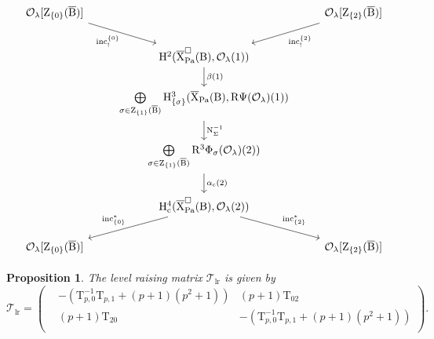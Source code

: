 \documentclass[10pt,a4paper]{amsart}
\newtheorem{proposition}{Proposition}
\def\Pa{\mathrm{Pa}}
\def\calO{\mathcal{O}}
\def\calT{\mathcal{T}}
\def\rmB{\mathrm{B}}
\def\rmH{\mathrm{H}}
\def\rmR{\mathrm{R}}
\def\rmT{\mathrm{T}}
\def\rmX{\mathrm{X}}
\def\rmZ{\mathrm{Z}}
\def\rmc{\mathrm{c}}
\begin{document}
\begin{equation}\label{level-raise-diagram}
\begin{tikzcd}
 \calO_{\lambda}[\rmZ_{\{0\}}(\overline{\rmB})] \arrow[rd, "\mathrm{inc}^{\{0\}}_{!}"'] &                                    &  \calO_{\lambda}[\rmZ_{\{2\}}(\overline{\rmB})]\arrow[ld, "\mathrm{inc}^{\{2\}}_{!}"] \\
                   & \rmH^{2}(\overline{\rmX}^{\square}_{\Pa}(\rmB), \calO_{\lambda}(1)) \arrow[d, "\beta(1)"]                   &                   \\
                   & \bigoplus\limits_{\sigma\in \rmZ_{\{1\}}(\overline{\rmB})}\rmH^{3}_{\{\sigma\}}(\overline{\rmX}_{\Pa}(\rmB), \rmR\Psi(\calO_{\lambda})(1)) \arrow[d, "\mathrm{N}^{-1}_{\Sigma}"]                   &                   \\
                   & \bigoplus\limits_{\sigma\in \rmZ_{\{1\}}(\overline{\rmB})}\rmR^{3}\Phi_{\sigma}(\calO_{\lambda})(2)) \arrow[d, "\alpha_{\rmc}(2)"]                   &                   \\
                   &  \rmH^{4}_{\rmc}(\overline{\rmX}^{\square}_{\Pa}(\rmB), \calO_{\lambda}(2)) \arrow[ld, "\mathrm{inc}^{\ast}_{\{0\}}"'] \arrow[rd, "\mathrm{inc}^{\ast}_{\{2\}}"] &                   \\
 \calO_{\lambda}[\rmZ_{\{0\}}(\overline{\rmB})]            &                                    &   \calO_{\lambda}[\rmZ_{\{2\}}(\overline{\rmB})]            
\end{tikzcd}
\end{equation}

\begin{proposition}\label{lr-matrix}
The level raising matrix $\calT_{\mathrm{lr}}$ is given by
\begin{equation*}
\calT_{\mathrm{lr}}=\begin{pmatrix} &-(\rmT^{-1}_{p,0}\rmT_{p,1}+(p+1)(p^{2}+1)) & (p+1)\rmT_{02}\\ &(p+1)\rmT_{20}& -(\rmT^{-1}_{p,0}\rmT_{p,1}+(p+1)(p^{2}+1))\\ \end{pmatrix}.
\end{equation*}
\end{proposition}
\end{document}

